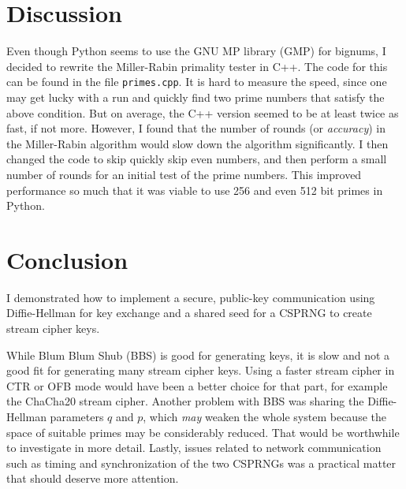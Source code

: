 \documentclass[a4paper,english,12pt]{article}
\begin{document}
\section{Discussion}
Even though Python seems to use the GNU MP library (GMP) for bignums, I decided
to rewrite the Miller-Rabin primality tester in C++. The code for this can be
found in the file \texttt{primes.cpp}. It is hard to measure the speed, since
one may get lucky with a run and quickly find two prime numbers that satisfy
the above condition. But on average, the C++ version seemed to be at least
twice as fast, if not more. However, I found that the number of rounds (or
\textit{accuracy}) in the Miller-Rabin algorithm would slow down the algorithm
significantly. I then changed the code to skip quickly skip even numbers, and
then perform a small number of rounds for an initial test of the prime numbers.
This improved performance so much that it was viable to use 256 and even 512
bit primes in Python.


\section{Conclusion}
I demonstrated how to implement a secure, public-key communication using
Diffie-Hellman for key exchange and a shared seed for a CSPRNG to create stream
cipher keys.

While Blum Blum Shub (BBS) is good for generating keys, it is slow and not a good fit
for generating many stream cipher keys. Using a faster stream cipher in CTR or
OFB mode would have been a better choice for that part, for example the
ChaCha20 \cite{chacha20} stream cipher. Another problem with BBS was sharing
the Diffie-Hellman parameters $q$ and $p$, which \textit{may} weaken the whole
system because the space of suitable primes may be considerably reduced. That
would be worthwhile to investigate in more detail. Lastly, issues related to
network communication such as timing and synchronization of the two CSPRNGs was
a practical matter that should deserve more attention.



\end{document}
